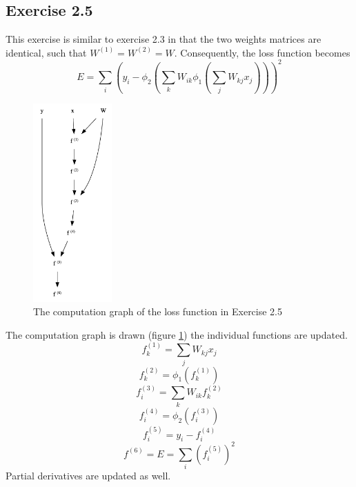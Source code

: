 \documentclass[fleqn]{article}
\begin{document}
\subsection*{Exercise 2.5}
This exercise is similar to exercise 2.3 in that the two weights matrices are identical, such that $W^{(1)} = W^{(2)} = W$. Consequently, the loss function becomes
\begin{equation}
    E=\sum_i \left ( y_i - \phi_2 \left ( \sum_k W_{ik} \phi_1 \left ( \sum_j W_{kj} x_j \right ) \right ) \right )^2
\end{equation}
\begin{figure}
    \centering
    \includegraphics[height=3in]{cg25.png}
    \caption{The computation graph of the loss function in Exercise 2.5}
    \label{fig:cg25}
\end{figure}
The computation graph is drawn (figure \ref{fig:cg25}) the individual functions are updated.
\begin{equation}
    f^{(1)}_k = \sum_j W_{kj} x_j
\end{equation}
\begin{equation}
    f^{(2)}_k = \phi_1 (f^{(1)}_k)
\end{equation}
\begin{equation}
    f^{(3)}_i = \sum_k W_{ik} f^{(2)}_k
\end{equation}
\begin{equation}
    f^{(4)}_i = \phi_2 (f^{(3)}_i)
\end{equation}
\begin{equation}
    f^{(5)}_i = y_i - f^{(4)}_i
\end{equation}
\begin{equation}
    f^{(6)} = E = \sum_i \left ( f^{(5)}_i \right )^2
\end{equation}
Partial derivatives are updated as well.
\end{document}
